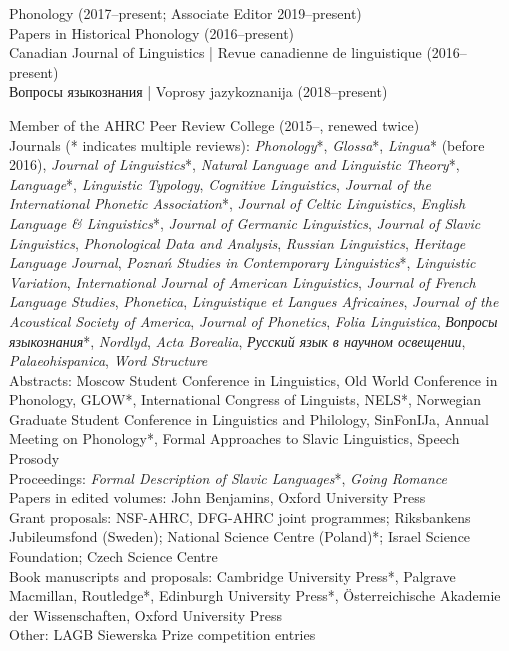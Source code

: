 \documentclass[a4paper,12pt]{article}
\newcommand\textrussian[1]{\foreignlanguage{russian}{#1}}
\newcommand\textitrussian[1]{\foreignlanguage{russian}{\textit{#1}}}
\newcommand\cvitem[1]{#1\par}
\newcommand{\block}[2]{\hspace{0pt}\marginpar{\plmarginyear{#1}}\cvitem{#2}}
\renewcommand*\plmarginyear[1]{%
\raggedleft\small\textdemibold{#1}%
}
\begin{document}
\block{Editorial board membership}{Phonology (2017--present; Associate Editor 2019--present)\\
  Papers in Historical Phonology (2016--present)\\
  Canadian Journal of Linguistics | Revue canadienne de linguistique (2016--present)\\
  \textrussian{Вопросы языкознания} | Voprosy jazykoznanija (2018--present)}
\block{Reviewing}{Member of the AHRC Peer Review College (2015--, renewed twice)\\Journals (* indicates multiple reviews): \emph{Phonology}*, \emph{Glossa}*, \emph{Lingua}* (before 2016), \emph{Journal of Linguistics}*, \emph{Natural Language and Linguistic Theory}*, \emph{Language}*, \emph{Linguistic Typology}, \emph{Cognitive Linguistics}, \emph{Journal of the International Phonetic Association}*, \emph{Journal of Celtic Linguistics}, \emph{English Language \&{} Linguistics}*,  \emph{Journal of Germanic Linguistics}, \emph{Journal of Slavic Linguistics}, \emph{Phonological Data and Analysis}, \emph{Russian Linguistics}, \emph{Heritage Language Journal}, \emph{Poznań Studies in Contemporary Linguistics}*, \emph{Linguistic Variation}, \emph{International Journal of American Linguistics}, \emph{Journal of French Language Studies}, \emph{Phonetica}, \emph{Linguistique et Langues Africaines}, \emph{Journal of the Acoustical Society of America}, \emph{Journal of Phonetics}, \emph{Folia Linguistica}, \textitrussian{Вопросы языкознания}*, \emph{Nordlyd}, \emph{Acta Borealia}, \textitrussian{Русский язык в научном освещении}, \emph{Palaeohispanica}, \emph{Word Structure}\\
Abstracts: Moscow Student Conference in Linguistics, Old World Conference in Phonology, GLOW*, International Congress of Linguists, NELS*, Norwegian Graduate Student Conference in Linguistics and Philology, SinFonIJa, Annual Meeting on Phonology*, Formal Approaches to Slavic Linguistics, Speech Prosody\\
Proceedings: \emph{Formal Description of Slavic Languages}*, \emph{Going Romance}\\
Papers in edited volumes: John Benjamins, Oxford University Press\\
Grant proposals: NSF-AHRC, DFG-AHRC joint programmes; Riksbankens Jubileumsfond (Sweden); National Science Centre (Poland)*; Israel Science Foundation; Czech Science Centre\\
Book manuscripts and proposals: Cambridge University Press*, Palgrave Macmillan, Routledge*, Edinburgh University Press*, Österreichische Akademie der Wissenschaften, Oxford University Press\\
Other: LAGB Siewerska Prize competition entries}
\end{document}
